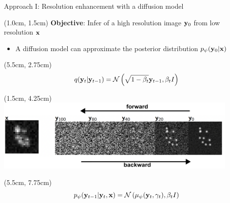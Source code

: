 \documentclass{beamer}					%
\begin{document}
\begin{frame}{Approach I: Resolution enhancement with a diffusion model}

\begin{textblock*}{13cm}(1.0cm, 1.5cm)
\textbf{Objective}: Infer of a high resolution image $\bold{y}_0$ from low resolution $\bold{x}$
\begin{itemize}
\item A diffusion model can approximate the posterior distribution  $p_{\psi}(\bold{y}_0\lvert \bold{x})$
\end{itemize}
\end{textblock*}

\begin{textblock*}{2cm}(5.5cm, 2.75cm)
\begin{equation*}
q(\bold{y}_{t}|\bold{y}_{t-1}) = \mathcal{N}\left(\sqrt{1-\beta_{t}}\bold{y}_{t-1},\beta_t I\right)
\end{equation*}
\end{textblock*}

\begin{textblock*}{12cm}(1.5cm, 4.25cm)
\includegraphics[width=12cm]{../../ddpm/ddpm/media/ForwardBackward.png}
\end{textblock*}

\begin{textblock*}{2cm}(5.5cm, 7.75cm)
\begin{equation*}
p_{\psi}(\bold{y}_{t-1}|\bold{y}_{t},\bold{x}) = \mathcal{N}\left(\mu_{\psi}(\bold{y}_{t},\gamma_{t}),\beta_{t}I\right)
\end{equation*}

\end{textblock*}

\end{frame}
\end{document}
